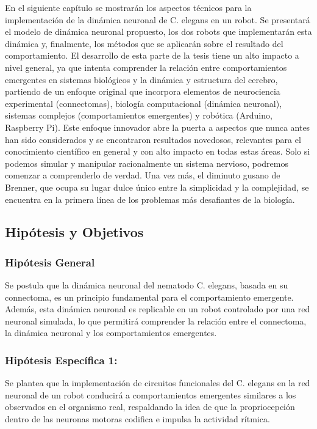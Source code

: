  En el siguiente capítulo se mostrarán los aspectos técnicos para la implementación de la dinámica neuronal de C. elegans en un robot. Se presentará el modelo de dinámica neuronal propuesto, los dos robots que implementarán esta dinámica y, finalmente, los métodos que se aplicarán sobre el resultado del comportamiento. El desarrollo de esta parte de la tesis tiene un alto impacto a nivel general, ya que intenta comprender la relación entre comportamientos emergentes en sistemas biológicos y la dinámica y estructura del cerebro, partiendo de un enfoque original que incorpora elementos de neurociencia experimental (connectomas), biología computacional (dinámica neuronal), sistemas complejos (comportamientos emergentes) y robótica (Arduino, Raspberry Pi). Este enfoque innovador abre la puerta a aspectos que nunca antes han sido considerados y se encontraron resultados novedosos, relevantes para el conocimiento científico en general y con alto impacto en todas estas áreas. Solo si podemos simular y manipular racionalmente un sistema nervioso, podremos comenzar a comprenderlo de verdad. Una vez más, el diminuto gusano de Brenner, que ocupa su lugar dulce único entre la simplicidad y la complejidad, se encuentra en la primera línea de los problemas más desafiantes de la biología.
 
 
\subsection{Hipótesis y Objetivos}
 
 \subsubsection{Hipótesis General}
 
 Se postula que la dinámica neuronal del nematodo C. elegans, basada en su connectoma, es un principio fundamental para el comportamiento emergente. Además, esta dinámica neuronal es replicable en un robot controlado por una red neuronal simulada, lo que permitirá comprender la relación entre el connectoma, la dinámica neuronal y los comportamientos emergentes.
 
 \subsubsection{Hipótesis Específica 1:}
 
 Se plantea que la implementación de circuitos funcionales del C. elegans en la red neuronal de un robot conducirá a comportamientos emergentes similares a los observados en el organismo real, respaldando la idea de que la propriocepción dentro de las neuronas motoras codifica e impulsa la actividad rítmica.
 
